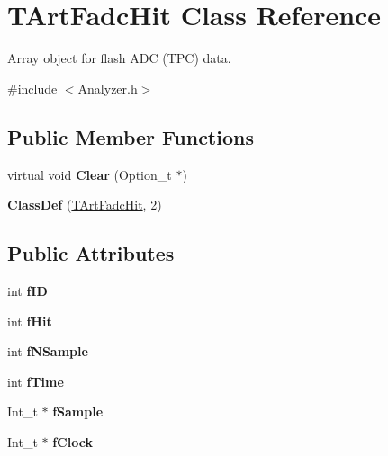 \hypertarget{classTArtFadcHit}{
\section{TArtFadcHit Class Reference}
\label{classTArtFadcHit}
}


Array object for flash ADC (TPC) data.  




{\ttfamily \#include $<$Analyzer.h$>$}

\subsection*{Public Member Functions}
\begin{DoxyCompactItemize}
\item 
\hypertarget{classTArtFadcHit_ab6ddc4a1807b9cb0e22e15b2b7b86327}{
virtual void {\bfseries Clear} (Option\_\-t $\ast$)}
\label{classTArtFadcHit_ab6ddc4a1807b9cb0e22e15b2b7b86327}

\item 
\hypertarget{classTArtFadcHit_af0f48f8c0f31be916b61f455d9d55a7a}{
{\bfseries ClassDef} (\hyperlink{classTArtFadcHit}{TArtFadcHit}, 2)}
\label{classTArtFadcHit_af0f48f8c0f31be916b61f455d9d55a7a}

\end{DoxyCompactItemize}
\subsection*{Public Attributes}
\begin{DoxyCompactItemize}
\item 
\hypertarget{classTArtFadcHit_a08bb2a7d172d18f7ec55e24317ee6bb9}{
int {\bfseries fID}}
\label{classTArtFadcHit_a08bb2a7d172d18f7ec55e24317ee6bb9}

\item 
\hypertarget{classTArtFadcHit_a7b0fcb8e11b91f0c4eccd46bf416de0c}{
int {\bfseries fHit}}
\label{classTArtFadcHit_a7b0fcb8e11b91f0c4eccd46bf416de0c}

\item 
\hypertarget{classTArtFadcHit_a78d670d111de1aa933a6a0c48332ea58}{
int {\bfseries fNSample}}
\label{classTArtFadcHit_a78d670d111de1aa933a6a0c48332ea58}

\item 
\hypertarget{classTArtFadcHit_a11b39f42c31e4e519c0caa199b0a9b0a}{
int {\bfseries fTime}}
\label{classTArtFadcHit_a11b39f42c31e4e519c0caa199b0a9b0a}

\item 
\hypertarget{classTArtFadcHit_aa6fd2864eaac1112e9cb686d689bae15}{
Int\_\-t $\ast$ {\bfseries fSample}}
\label{classTArtFadcHit_aa6fd2864eaac1112e9cb686d689bae15}

\item 
\hypertarget{classTArtFadcHit_a1e9953888b4720019fda0e629b7dd405}{
Int\_\-t $\ast$ {\bfseries fClock}}
\label{classTArtFadcHit_a1e9953888b4720019fda0e629b7dd405}

\end{DoxyCompactItemize}
